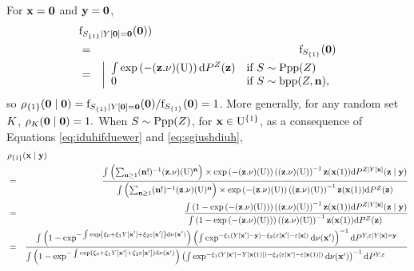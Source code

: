 For $\mathbf{x}=\mathbf{0}$  and  $\mathbf{y}=\mathbf{0}$,
\begin{eqnarray*}
\lefteqn{\density_{\Sample_{\{1\}}\mid\Signal[\mathbf{0}]=\mathbf{0}}(\mathbf{0}))}\\&=&
\density_{\Sample_{\{1\}}}(\mathbf{0})\\
&=&\left|\begin{array}{ll}
\int \exp\left(-(\desvar.\dominantU)(\Pop)\right)\derive P^{\Desvar}(\desvar)&\text{if }\Sample\sim\mathrm{Ppp}(\Desvar)\\
0&\text{if }\Sample\sim\mathrm{bpp}(\Desvar,\samplesize),\end{array}\right.
\end{eqnarray*}
so $\rho_{\{1\}}(\mathbf{0}\mid\mathbf{0})=
\mathrm{f}_{S_{\{1\}}\mid Y[\mathbf{0}]=\mathbf{0}}(\mathbf{0})/\mathrm{f}_{S_{\{1\}}}(\mathbf{0})=
1$.
More generally, for any random set $K$, $\rho_{K}(\mathbf{0}\mid\mathbf{0})=1.$
When $S\sim \mathrm{Ppp}(Z)$,
for $\mathbf{x}\in\mathrm{U}^{\{1\}}$, as a consequence of Equations \eqref{eq:iduhifduewer} and \eqref{eq:sgiushdiuh},
\begin{eqnarray*}
\lefteqn{\densityratio_{\{1\}}(\position\mid\signal)}\\&=&\frac{
\int 
\left(\sum_{\samplesize\geq 1} (\samplesize!)^{-1}(\desvar.\dominantU)(\Pop)^\samplesize\right)\times \exp\left(-(\desvar.\dominantU)(\Pop)\right)
\left((\desvar.\dominantU)(\Pop)\right)^{-1}\desvar(\position(1))\derive P^{\Desvar\mid \Signal[\position]}(\desvar\mid\signal) 
}{
\int 
\left(\sum_{\samplesize\geq 1} (\samplesize!)^{-1}(\desvar.\dominantU)(\Pop)^\samplesize\right)\times \exp\left(-(\desvar.\dominantU)(\Pop)\right)
\left((\desvar.\dominantU)(\Pop)\right)^{-1}\desvar(\position(1))\derive P^{\Desvar}(\desvar) 
}\\&=&\frac{
\int 
\left(1-\exp\left(-(\desvar.\dominantU)(\Pop)\right)\right)
\left((\desvar.\dominantU)(\Pop)\right)^{-1}\desvar(\position(1))\derive P^{\Desvar\mid \Signal[\position]}(\desvar\mid\signal) 
}{
\int 
\left(1-\exp\left(-(\desvar.\dominantU)(\Pop)\right)\right)
\left((\desvar.\dominantU)(\Pop)\right)^{-1}\desvar(\position(1))\derive P^{\Desvar}(\desvar)\phantom{11111} 
}\\&=&\frac{
\int 
\left(1-\exp^{-\int \exp\left( \paramnuisance_0+\paramnuisance_1\Signal[\position']+\paramnuisance_2\varepsilon[\position']\right)\derive\dominantU(\position')}\right)
\left(\int \exp^{-\paramnuisance_1(\Signal[\position']-\signal)-\paramnuisance_2(\varepsilon[\position']-\varepsilon[\position])}\derive\nu(\position')\right)^{-1}\derive P^{\Signal,\varepsilon\mid \Signal[\position]=\signal} 
}{
\int
\left(1-\exp^{-\int \exp\left( \paramnuisance_0+\paramnuisance_1\Signal[\position']+\paramnuisance_2\varepsilon[\position']\right)\derive\dominantU(\position')}\right)
\left(\int \exp^{-\paramnuisance_1(\Signal[\position']-\Signal[\position(1)])-\paramnuisance_2(\varepsilon[\position']-\varepsilon[\position(1)])}\derive\nu(\position')\right)^{-1}\derive P^{\Signal,\varepsilon}\phantom{11111} 
}
\end{eqnarray*}

